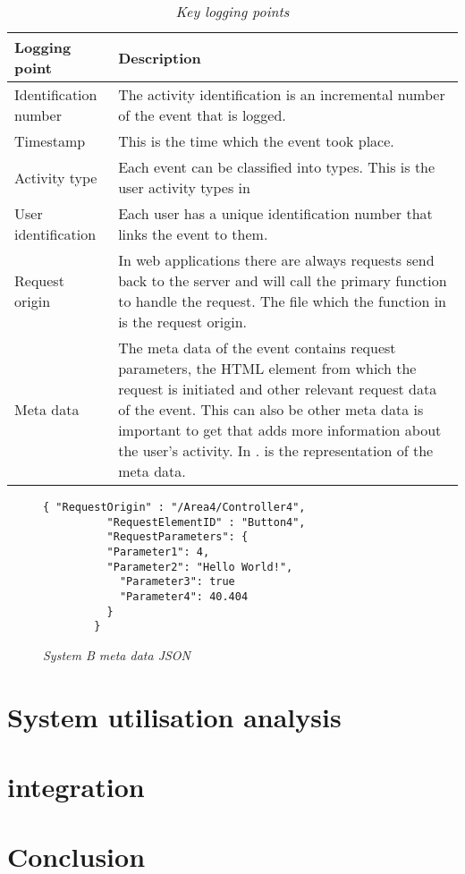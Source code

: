 \begin{table}[!htb]
	\centering
	\small
	\caption[Key logging points]
	{\textit{Key logging points}}
	\label{tbl:Ch2_KeyLogging_Points}
	\begin{tabularx}{\textwidth}{|l|X|}
		\hline \textbf{Logging point} & \textbf{Description} \\
		\hline Identification number & The activity identification is an incremental number of the event that is logged.\\
		\hline Timestamp & This is the time which the event took place.\\
		\hline Activity type & Each event can be classified into types. This is the user activity types in \Cref{tbl:Ch2_User_ActivityTypes} \\
		\hline User identification & Each user has a unique identification number that links the event to them. \\
		\hline Request origin & In web applications there are always requests send back to the server and will call the primary function to handle the request. The file which the function in is the request origin. \\
		\hline Meta data & The meta data of the event contains request parameters, the HTML element from which the request is initiated and other relevant request data of the event. This can also be other meta data is important to get that adds more information about the user's activity. In \Cref{fig:Ch2_Metadata_Json_Example}. is the representation of the meta data. \\
		\hline
	\end{tabularx}
\end{table}

\begin{figure}[!htb]
	\centering
	\begin{lstlisting}[style=json] 
		{ "RequestOrigin" : "/Area4/Controller4",
		  "RequestElementID" : "Button4",
		  "RequestParameters": {
		  "Parameter1": 4,
		  "Parameter2": "Hello World!",
			"Parameter3": true
			"Parameter4": 40.404
		  }		
		}
	\end{lstlisting}
	\caption[System B meta data JSON]
	{\textit{System B meta data JSON}}\label{fig:Ch2_Metadata_Json_Example}
\end{figure}

\section{System utilisation analysis}\label{ch2:system_utilisation_analysis}

\section{integration}

\section{Conclusion}